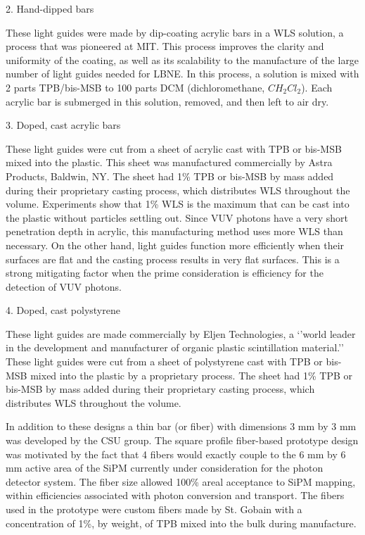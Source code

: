 2.  Hand-dipped bars

These light guides were made by dip-coating acrylic bars in a WLS
solution, a process that was pioneered at MIT.  This process improves
the clarity and uniformity of the coating, as well as its scalability
to the manufacture of the large number of light guides needed for
LBNE.  In this process, a solution is mixed with 2 parts TPB/bis-MSB
to 100 parts DCM (dichloromethane, $CH_{2}Cl_{2}$).  Each acrylic bar
is submerged in this solution, removed, and then left to air dry.

3.  Doped, cast acrylic bars

These light guides were cut from a sheet of acrylic cast with TPB or
bis-MSB mixed into the plastic. This sheet was manufactured
commercially by Astra Products, Baldwin, NY.  The sheet had 1\% TPB or
bis-MSB by mass added during their proprietary casting process, which
distributes WLS throughout the volume.  Experiments show that 1\% WLS
is the maximum that can be cast into the plastic without particles
settling out.  Since VUV photons have a very short penetration depth
in acrylic, this manufacturing method uses more WLS than necessary.
On the other hand, light guides function more efficiently when their
surfaces are flat and the casting process results in very flat
surfaces.  This is a strong mitigating factor when the prime
consideration is efficiency for the detection of VUV photons.

4.  Doped, cast polystyrene

These light guides are made commercially by Eljen Technologies, a
`'world leader in the development and manufacturer of organic plastic
scintillation material.''  These light guides were cut from a sheet of
polystyrene cast with TPB or bis-MSB mixed into the plastic by a
proprietary process.  The sheet had 1\% TPB or bis-MSB by mass added
during their proprietary casting process, which distributes WLS
throughout the volume.
 
In addition to these designs a thin bar (or fiber) with dimensions 3
mm by 3 mm was developed by the CSU group. The square profile
fiber-based prototype design was motivated by the fact that 4 fibers
would exactly couple to the 6 mm by 6 mm active area of the SiPM
currently under consideration for the photon detector system. The
fiber size allowed 100\% areal acceptance to SiPM mapping, within
efficiencies associated with photon conversion and transport. The
fibers used in the prototype were custom fibers made by St. Gobain
with a concentration of 1\%, by weight, of TPB mixed into the bulk
during manufacture.

